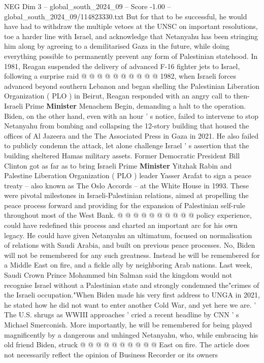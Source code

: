 \begin{textsample}{NEG Dim 3 – global\_south\_2024\_09 – Score -1.00 – global\_south\_2024\_09/114823330.txt}
But for that to be successful, he would have had to withdraw the multiple vetoes at the UNSC on important resolutions, toe a harder line with Israel, and acknowledge that Netanyahu has been stringing him along by agreeing to a demilitarised Gaza in the future, while doing everything possible to permanently prevent any form of Palestinian statehood.
In 1981, Reagan suspended the delivery of advanced F-16 fighter jets to Israel, following a surprise raid @ @ @ @ @ @ @ @ @ @ 1982, when Israeli forces advanced beyond southern Lebanon and began shelling the Palestinian Liberation Organization ( PLO ) in Beirut, Reagan responded with an angry call to then-Israeli Prime \textbf{Minister} Menachem Begin, demanding a halt to the operation.
Biden, on the other hand, even with an hour ' s notice, failed to intervene to stop Netanyahu from bombing and collapsing the 12-story building that housed the offices of Al Jazeera and the The Associated Press in Gaza in 2021.
He also failed to publicly condemn the attack, let alone challenge Israel ' s assertion that the building sheltered Hamas military assets.
Former Democratic President Bill Clinton got as far as to bring Israeli Prime \textbf{Minister} Yitzhak Rabin and Palestine Liberation Organization ( PLO ) leader Yasser Arafat to sign a peace treaty -- also known as The Oslo Accords -- at the White House in 1993.
These were pivotal milestones in Israeli-Palestinian relations, aimed at propelling the peace process forward and providing for the expansion of Palestinian self-rule throughout most of the West Bank. @ @ @ @ @ @ @ @ @ @ policy experience, could have redefined this process and charted an important arc for his own legacy.
He could have given Netanyahu an ultimatum, focused on normalisation of relations with Saudi Arabia, and built on previous peace processes.
No, Biden will not be remembered for any such greatness.
Instead he will be remembered for a Middle East on fire, and a fickle ally by neighboring Arab nations.
Last week, Saudi Crown Prince Mohammed bin Salman said the kingdom would not recognise Israel without a Palestinian state and strongly condemned the"crimes of the Israeli occupation."When Biden made his very first address to UNGA in 2021, he stated how he did not want to enter another Cold War, and yet here we are. ' The U.S. shrugs as WWIII approaches ' cried a recent headline by CNN ' s Michael Smerconish.
More importantly, he will be remembered for being played magnificently by a dangerous and unhinged Netanyahu, who, while embracing his old friend Biden, struck @ @ @ @ @ @ @ @ @ @ East on fire.
The article does not necessarily reflect the opinion of Business Recorder or its owners

\end{textsample}
